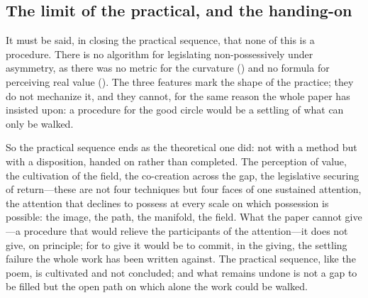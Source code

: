 \subsection{The limit of the practical, and the handing-on}
\label{p09:sec:practical-limit}

It must be said, in closing the practical sequence, that none of this is a procedure. There is no algorithm for legislating non-possessively under asymmetry, as there was no metric for the curvature () and no formula for perceiving real value (). The three features mark the shape of the practice; they do not mechanize it, and they cannot, for the same reason the whole paper has insisted upon: a procedure for the good circle would be a settling of what can only be walked. 

So the practical sequence ends as the theoretical one did: not with a method but with a disposition, handed on rather than completed. The perception of value, the cultivation of the field, the co-creation across the gap, the legislative securing of return---these are not four techniques but four faces of one sustained attention, the attention that declines to possess at every scale on which possession is possible: the image, the path, the manifold, the field. What the paper cannot give---a procedure that would relieve the participants of the attention---it does not give, on principle; for to give it would be to commit, in the giving, the settling failure the whole work has been written against. The practical sequence, like the poem, is cultivated and not concluded; and what remains undone is not a gap to be filled but the open path on which alone the work could be walked.

